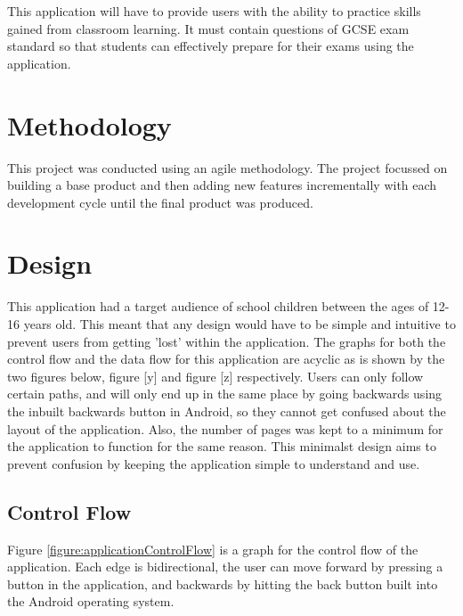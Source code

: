 \documentclass{article}
\begin{document}
This application will have to provide users with the ability to practice skills gained from classroom learning. It must contain questions of GCSE exam standard so that students can effectively prepare for their exams using the application. 

%
%
%

\section{Methodology}
\label{section:methodology}

This project was conducted using an agile methodology. The project focussed on building a base product and then adding new features incrementally with each development cycle until the final product was produced. 


\section{Design}
\label{section:design}

This application had a target audience of school children between the ages of 12-16 years old. This meant that any design would have to be simple and intuitive to prevent users from getting 'lost' within the application. The graphs for both the control flow and the data flow for this application are acyclic as is shown by the two figures below, figure [y] and figure [z] respectively. Users can only follow certain paths, and will only end up in the same place by going backwards using the inbuilt backwards button in Android, so they cannot get confused about the layout of the application. Also, the number of pages was kept to a minimum for the application to function for the same reason. This minimalst design aims to prevent confusion by keeping the application simple to understand and use. \\

\subsection{Control Flow}

Figure \ref{figure:applicationControlFlow} is a graph for the control flow of the application. Each edge is bidirectional, the user can move forward by pressing a button in the application, and backwards by hitting the back button built into the Android operating system. \\
\end{document}
